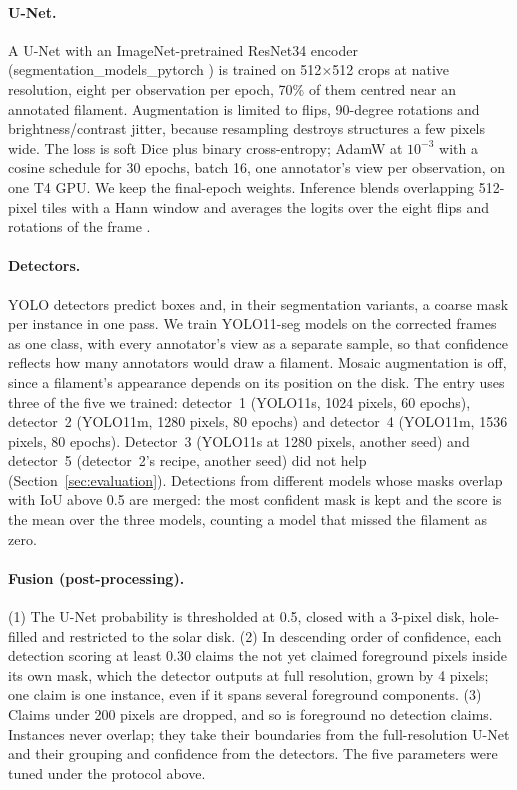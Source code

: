 \documentclass[sigconf]{acmart}
\begin{document}
\paragraph{U-Net.} A U-Net \cite{ronneberger2015unet} with an ImageNet-pretrained ResNet34 encoder \cite{he2016resnet} (segmentation\_models\_pytorch \cite{iakubovskii2019smp}) is trained on 512$\times$512 crops at native resolution, eight per observation per epoch, 70\% of them centred near an annotated filament. Augmentation is limited to flips, 90-degree rotations and brightness/contrast jitter, because resampling destroys structures a few pixels wide. The loss is soft Dice \cite{milletari2016vnet} plus binary cross-entropy; AdamW at $10^{-3}$ with a cosine schedule for 30 epochs, batch 16, one annotator's view per observation, on one T4 GPU. We keep the final-epoch weights. Inference blends overlapping 512-pixel tiles with a Hann window and averages the logits over the eight flips and rotations of the frame \cite{wang2019tta}.

\paragraph{Detectors.} YOLO \cite{redmon2016yolo} detectors predict boxes and, in their segmentation variants, a coarse mask per instance in one pass. We train YOLO11-seg models \cite{jocher2024yolo11} on the corrected frames as one class, with every annotator's view as a separate sample, so that confidence reflects how many annotators would draw a filament. Mosaic augmentation is off, since a filament's appearance depends on its position on the disk. The entry uses three of the five we trained: detector~1 (YOLO11s, 1024 pixels, 60 epochs), detector~2 (YOLO11m, 1280 pixels, 80 epochs) and detector~4 (YOLO11m, 1536 pixels, 80 epochs). Detector~3 (YOLO11s at 1280 pixels, another seed) and detector~5 (detector~2's recipe, another seed) did not help (Section~\ref{sec:evaluation}). Detections from different models whose masks overlap with IoU above 0.5 are merged: the most confident mask is kept and the score is the mean over the three models, counting a model that missed the filament as zero.

\paragraph{Fusion (post-processing).} (1) The U-Net probability is thresholded at 0.5, closed with a 3-pixel disk, hole-filled and restricted to the solar disk. (2) In descending order of confidence, each detection scoring at least 0.30 claims the not yet claimed foreground pixels inside its own mask, which the detector outputs at full resolution, grown by 4 pixels; one claim is one instance, even if it spans several foreground components. (3) Claims under 200 pixels are dropped, and so is foreground no detection claims. Instances never overlap; they take their boundaries from the full-resolution U-Net and their grouping and confidence from the detectors. The five parameters were tuned under the protocol above.
\end{document}
